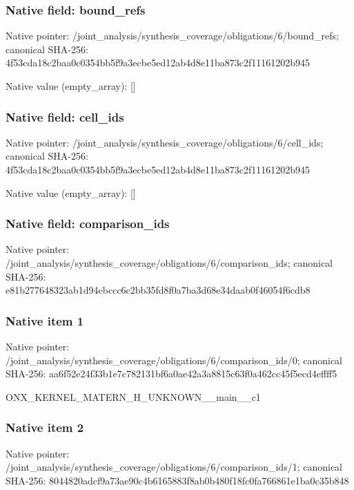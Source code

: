 \documentclass[10pt,a4paper]{article}
\begin{document}
\subsubsection{Native field: bound\_\allowbreak{}refs}
Native pointer: /joint\_\allowbreak{}analysis/synthesis\_\allowbreak{}coverage/obligations/6/bound\_\allowbreak{}refs; canonical SHA-256: 4f53cda18c2baa0c0354bb5f9a3ecbe5ed12ab4d8e11ba873c2f11161202b945

Native value (empty\_\allowbreak{}array): []

\subsubsection{Native field: cell\_\allowbreak{}ids}
Native pointer: /joint\_\allowbreak{}analysis/synthesis\_\allowbreak{}coverage/obligations/6/cell\_\allowbreak{}ids; canonical SHA-256: 4f53cda18c2baa0c0354bb5f9a3ecbe5ed12ab4d8e11ba873c2f11161202b945

Native value (empty\_\allowbreak{}array): []

\subsubsection{Native field: comparison\_\allowbreak{}ids}
Native pointer: /joint\_\allowbreak{}analysis/synthesis\_\allowbreak{}coverage/obligations/6/comparison\_\allowbreak{}ids; canonical SHA-256: e81b277648323ab1d94ebccc6c2bb35fd8f0a7ba3d68e34daab0f46054f6cdb8

\subsubsection{Native item 1}
Native pointer: /joint\_\allowbreak{}analysis/synthesis\_\allowbreak{}coverage/obligations/6/comparison\_\allowbreak{}ids/0; canonical SHA-256: aa6f52e24f33b1e7c782131bf6a0ae42a3a8815c63f0a462cc45f5ecd4effff5

\begingroup\raggedright\sloppy ONX\_\allowbreak{}KERNEL\_\allowbreak{}MATERN\_\allowbreak{}H\_\allowbreak{}UNKNOWN\_\allowbreak{}\_\allowbreak{}main\_\allowbreak{}\_\allowbreak{}c1\par\endgroup

\subsubsection{Native item 2}
Native pointer: /joint\_\allowbreak{}analysis/synthesis\_\allowbreak{}coverage/obligations/6/comparison\_\allowbreak{}ids/1; canonical SHA-256: 8044820adcf9a73ae90c4b6165883f8ab0b480f18fc0fa766861e1ba0c35b848
\end{document}
